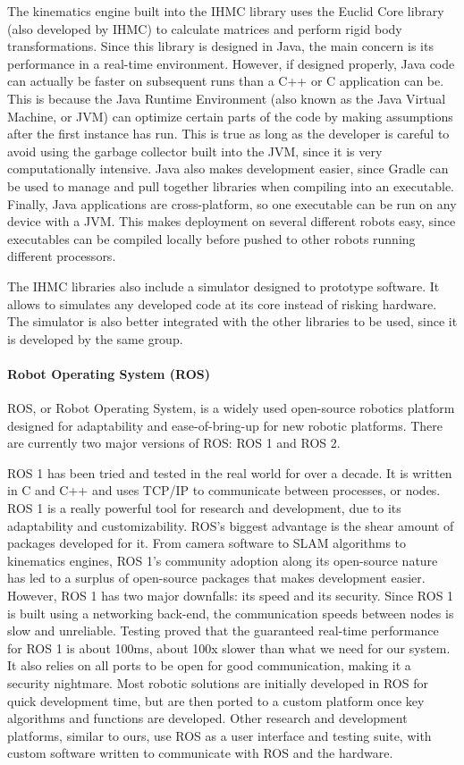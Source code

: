         The kinematics engine built into the IHMC library uses the Euclid Core library (also developed by IHMC) to calculate matrices and perform rigid body transformations. Since this library is designed in Java, the main concern is its performance in a real-time environment. However, if designed properly, Java code can actually be faster on subsequent runs than a C++ or C application can be. This is because the Java Runtime Environment (also known as the Java Virtual Machine, or JVM) can optimize certain parts of the code by making assumptions after the first instance has run. This is true as long as the developer is careful to avoid using the garbage collector built into the JVM, since it is very computationally intensive. Java also makes development easier, since Gradle can be used to manage and pull together libraries when compiling into an executable. Finally, Java applications are cross-platform, so one executable can be run on any device with a JVM. This makes deployment on several different robots easy, since executables can be compiled locally before pushed to other robots running different processors.

        The IHMC libraries also include a simulator designed to prototype software. It allows to simulates any developed code at its core instead of risking hardware. The simulator is also better integrated with the other libraries to be used, since it is developed by the same group.

        \paragraph*{Robot Operating System (ROS)}
        ROS, or Robot Operating System, is a widely used open-source robotics platform designed for adaptability and ease-of-bring-up for new robotic platforms. There are currently two major versions of ROS: ROS 1 and ROS 2.

        ROS 1 has been tried and tested in the real world for over a decade. It is written in C and C++ and uses TCP/IP to communicate between processes, or nodes. ROS 1 is a really powerful tool for research and development, due to its adaptability and customizability. ROS's biggest advantage is the shear amount of packages developed for it. From camera software to SLAM algorithms to kinematics engines, ROS 1's community adoption along its open-source nature has led to a surplus of open-source packages that makes development easier. However, ROS 1 has two major downfalls: its speed and its security. Since ROS 1 is built using a networking back-end, the communication speeds between nodes is slow and unreliable. Testing proved that the guaranteed real-time performance for ROS 1 is about 100ms, about 100x slower than what we need for our system. It also relies on all ports to be open for good communication, making it a security nightmare. Most robotic solutions are initially developed in ROS for quick development time, but are then ported to a custom platform once key algorithms and functions are developed. Other research and development platforms, similar to ours, use ROS as a user interface and testing suite, with custom software written to communicate with ROS and the hardware.

